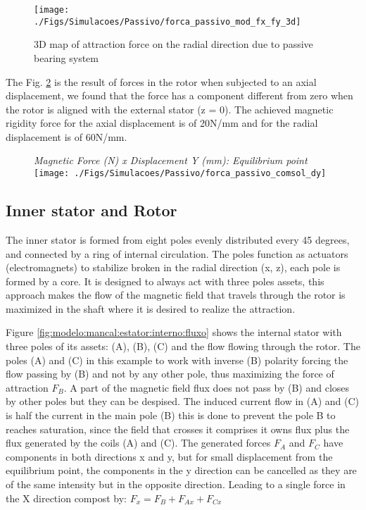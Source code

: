 \documentclass[10pt,fleqn,a4paper,twoside]{article}
\begin{document}
\begin{figure}[th]
\centering
\texttt{[image: ./Figs/Simulacoes/Passivo/forca\_passivo\_mod\_fx\_fy\_3d]}
\caption{3D map of attraction force on the radial direction due to passive bearing system}
\label{fig:forca:passivo:mod:fx:fy:3d}
\end{figure}

The Fig. \ref{fig:forca:passivo:comsol:dy} is the result of forces in the rotor when subjected to an axial displacement, we found that the force has a component different from zero when the rotor is aligned with the external stator (z = 0). The achieved magnetic rigidity force for the axial displacement is of 20N/mm and for the radial displacement is of 60N/mm. 

\begin{figure}[th]
\centering
{\textit{Magnetic Force (N) x Displacement Y (mm): Equilibrium point}}\\
\texttt{[image: ./Figs/Simulacoes/Passivo/forca\_passivo\_comsol\_dy]}
\caption{}
\label{fig:forca:passivo:comsol:dy}
\end{figure}

\subsection{Inner stator and Rotor}

The inner stator is formed from eight poles evenly distributed every 45 degrees, and connected by a ring of internal circulation. The poles function as actuators (electromagnets) to stabilize broken in the radial direction (x, z), each pole is formed by a core.  It is designed to always act with three poles assets, this approach makes the flow of the magnetic field that travels through the rotor is maximized in the shaft where it is desired to realize the attraction.

Figure \ref{fig:modelo:mancal:estator:interno:fluxo} shows the internal stator with three poles of its assets: (A), (B), (C) and the flow flowing through the rotor. The poles (A) and (C) in this example to work with inverse (B) polarity forcing the flow passing by (B) and not by any other pole, thus maximizing the force of attraction $F_B$. A part of the magnetic field flux does not pass by (B) and closes by other poles but they can be despised. The induced current flow in (A) and (C) is half the current in the main pole (B) this is done to prevent the pole B to reaches saturation, since the field that crosses it comprises it owns flux plus the flux generated by the coils (A) and (C). The generated forces $F_A$ and $F_C$  have components in both directions x and y, but for small displacement from the equilibrium point, the components in the y direction can be cancelled as they are of the same intensity but in the opposite direction. Leading to a single force in the X direction compost by: $F_x = F_B + F_{Ax} + F_{Cx}$
\end{document}
